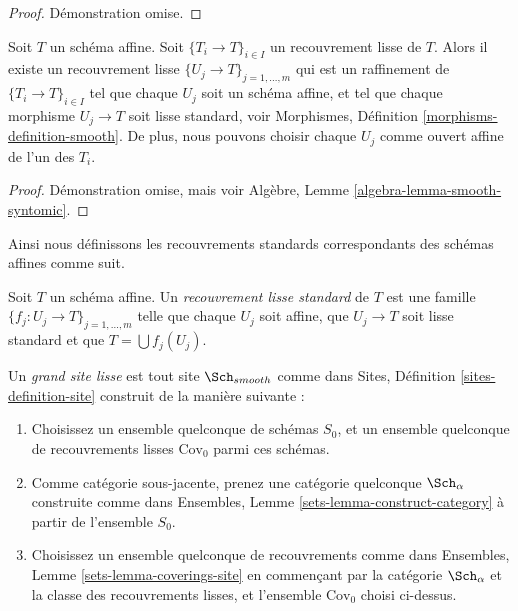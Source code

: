 \begin{proof}
Démonstration omise.
\end{proof}

\begin{lemma}
\label{lemma-smooth-affine}
Soit $T$ un schéma affine. Soit $\{T_i \to T\}_{i \in I}$ un recouvrement lisse de $T$. Alors il existe un recouvrement lisse $\{U_j \to T\}_{j = 1, \ldots, m}$ qui est un raffinement de $\{T_i \to T\}_{i \in I}$ tel que chaque $U_j$ soit un schéma affine, et tel que chaque morphisme $U_j \to T$ soit lisse standard, voir Morphismes, Définition \ref{morphisms-definition-smooth}. De plus, nous pouvons choisir chaque $U_j$ comme ouvert affine de l’un des $T_i$.
\end{lemma}

\begin{proof}
Démonstration omise, mais voir Algèbre, Lemme \ref{algebra-lemma-smooth-syntomic}.
\end{proof}

\noindent
Ainsi nous définissons les recouvrements standards correspondants des schémas affines comme suit.

\begin{definition}
\label{definition-standard-smooth}
Soit $T$ un schéma affine. Un {\it recouvrement lisse standard} de $T$ est une famille $\{f_j : U_j \to T\}_{j = 1, \ldots, m}$ telle que chaque $U_j$ soit affine, que $U_j \to T$ soit lisse standard et que $T = \bigcup f_j(U_j)$.
\end{definition}

\begin{definition}
\label{definition-big-smooth-site}
Un {\it grand site lisse} est tout site $\Sch_{smooth}$ comme dans Sites, Définition \ref{sites-definition-site} construit de la manière suivante :
\begin{enumerate}
\item Choisissez un ensemble quelconque de schémas $S_0$, et un ensemble quelconque de recouvrements lisses $\text{Cov}_0$ parmi ces schémas.
\item Comme catégorie sous-jacente, prenez une catégorie quelconque $\Sch_\alpha$\newline construite comme dans Ensembles, Lemme \ref{sets-lemma-construct-category} à partir de l'ensemble $S_0$.
\item Choisissez un ensemble quelconque de recouvrements comme dans Ensembles, Lemme \ref{sets-lemma-coverings-site} en commençant par la catégorie $\Sch_\alpha$ et la classe des recouvrements lisses, et l'ensemble $\text{Cov}_0$ choisi ci-dessus.
\end{enumerate}
\end{definition}

